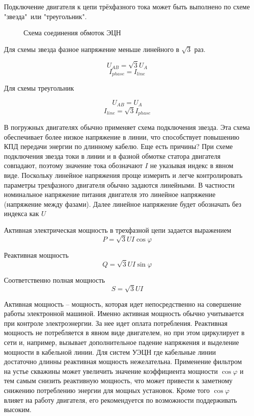 Подключение двигателя к цепи трёхфазного тока может быть выполнено по схеме "звезда"\ или "треугольник".


\begin{figure}[H]
	\centering
	
	\caption{Схема соединения обмоток ЭЦН}
	\label{ris:electicity_triangle_star}
\end{figure}

Для схемы звезда фазное напряжение меньше линейного в $\sqrt{3}$ раз.

$$ U_{AB} = \sqrt{3} U_{A} $$
$$ I_{phase} = I_{line} $$

Для схемы треугольник 

$$ U_{AB} =  U_{A} $$
$$ I_{line} =\sqrt{3} I_{phase} $$


В погружных двигателях обычно применяет схема подключения звезда. Эта схема обеспечивает более низкое напряжение в линии, что способствует повышению КПД передачи энергии по длинному кабелю. Еще есть причины?
При схеме подключения звезда токи в линии и в фазной обмотке статора двигателя совпадают, поэтому значение тока обозначают $I$ не указывая индекс в явном виде. Поскольку линейное напряжения проще измерить и легче контролировать параметры трехфазного двигателя обычно задаются линейными. В частности номинальное напряжение питания двигателя это линейное напряжение (напряжение между фазами). Далее линейное напряжение будет обозначать без индекса как $U$

Активная электрическая мощность в трехфазной цепи задается выражением 
$$ P= \sqrt{3}U I \cos \varphi$$

Реактивная мощность 
$$ Q= \sqrt{3}U I \sin \varphi$$

Соответственно полная мощность 
$$ S= \sqrt{3}U I $$

Активная мощность -- мощность, которая идет непосредственно на совершение работы электронной машиной. Именно активная мощность обычно учитывается при контроле электроэнергии. За нее идет оплата потребления. Реактивная мощность не потребляется в явном виде двигателем, но при этом циркулирует в сети и, например, вызывает дополнительное падение напряжения и выделение мощности в кабельной линии. Для систем УЭЦН где кабельные линии достаточно длинны реактивная мощность нежелательна. Применение фильтром на устье скважины может увеличить значение коэффициента мощности $ \cos \varphi$ и тем самым снизить реактивную мощность, что может привести к заметному снижению потреблению энергии для мощных установок. Кроме того $ \cos \varphi$ влияет на работу двигателя, его рекомендуется по возможности поддерживать высоким. 

